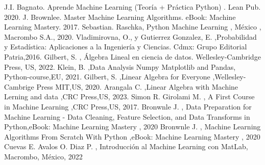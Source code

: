 \documentclass[12pt,spanish,oneside,letterpaper]{book}
\begin{document}



\setcounter{page}{1}
\tableofcontents
\newpage
{}
\listoffigures
\newpage
{}
\listoftables
\newpage





\newpage
\setcounter{page}{1}







%
%
%

\begin{thebibliography}{99}
   J.I. Bagnato. Aprende Machine Learning (Teoría + Práctica Python) . Lean Pub. 2020.
   J. Brownlee. Master Machine Learning Algorithms. eBook: Machine Learning Mastery. 2017.
   Sebastian. Raschka, Python Machine Learning , México , Macrombo S.A., 2020.
   Vladimirovna, O., y Gutierrez Gonzalez, E. ,Probabilidad y Estadística: Aplicaciones a la Ingeniería y Ciencias. Cdmx: Grupo Editorial Patria,2016.
   Gilbert, S. , Álgebra Lineal en ciencia de datos. Wellesley-Cambridge Press, US, 2022.
   Klein, B. ,Data Analysis Numpy Matplotlib and Pandas, Python-course,EU, 2021.
   Gilbert, S. ,Linear Algebra for Everyone ,Wellesley-Cambrige Press MIT,US, 2020.
   Arangala C. ,Linear Algebra with Machine Lerning and data ,CRC Press,US, 2023.
   Simon R. Girolami M. , A First Course in Machine Learning ,CRC Press,US, 2017.
   Bronwnle J. , Data Preparation for Machine Learning - Data Cleaning, Feature Selection, and Data Transforms in Python,eBook: Machine Learning Mastery , 2020
   Bronwnle J. , Machine Learning Algorithms From Scratch With Python ,eBook: Machine Learning Mastery , 2020
   Cuevas E. Avalos O. Diaz P. , Introducción al Machine Learning con MatLab, Macrombo, México, 2022
\end{thebibliography}
\end{document}
